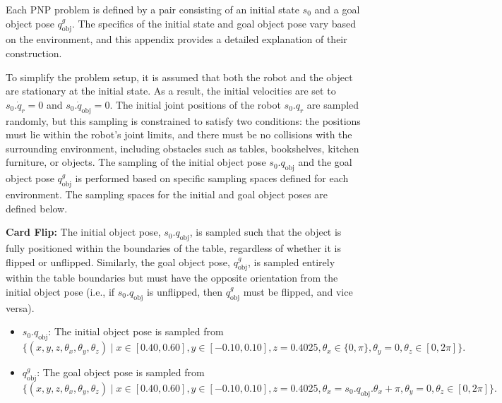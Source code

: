 Each PNP problem is defined by a pair consisting of an initial state \(s_0\) and a goal object pose \(q^g_\text{obj}\). The specifics of the initial state and goal object pose vary based on the environment, and this appendix provides a detailed explanation of their construction. %

To simplify the problem setup, it is assumed that both the robot and the object are stationary at the initial state. As a result, the initial velocities are set to \(s_0.\dot{q}_r = 0\) and \(s_0.\dot{q}_\text{obj} = 0\). The initial joint positions of the robot \(s_0.q_r\) are sampled randomly, but this sampling is constrained to satisfy two conditions: the positions must lie within the robot's joint limits, and there must be no collisions with the surrounding environment, including obstacles such as tables, bookshelves, kitchen furniture, or objects. The sampling of the initial object pose \(s_0.q_\text{obj}\) and the goal object pose \(q^g_\text{obj}\) is performed based on specific sampling spaces defined for each environment. The sampling spaces for the initial and goal object poses are defined below.

\textbf{Card Flip:} The initial object pose, $s_0.q_{\text{obj}}$, is sampled such that the object is fully positioned within the boundaries of the table, regardless of whether it is flipped or unflipped. Similarly, the goal object pose, $q_{\text{obj}}^g$, is sampled entirely within the table boundaries but must have the opposite orientation from the initial object pose (i.e., if $s_0.q_\text{obj}$ is unflipped, then $q^g_\text{obj}$ must be flipped, and vice versa).

\begin{itemize}
    \item $s_0.q_\text{obj}$: The initial object pose is sampled from 
    \[
    \{(x, y, z, \theta_x, \theta_y, \theta_z) \mid x \in [0.40, 0.60], y \in [-0.10, 0.10], 
    z = 0.4025, \theta_x \in \{0, \pi\}, \theta_y = 0, \theta_z \in [0, 2\pi]\}.
    \]
    \item $q^g_\text{obj}$: The goal object pose is sampled from 
    \[
    \{(x, y, z, \theta_x, \theta_y, \theta_z) \mid x \in [0.40, 0.60], y \in [-0.10, 0.10], 
    z = 0.4025, \theta_x = s_0.q_\text{obj}.\theta_x + \pi, \theta_y = 0, \theta_z \in [0, 2\pi]\}.
    \]
\end{itemize}



